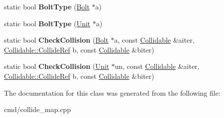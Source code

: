 \begin{DoxyCompactItemize}
\item 
static bool {\bfseries Bolt\+Type} (\hyperlink{classBolt}{Bolt} $\ast$a)\hypertarget{classCollideChecker_abb4927547fd6360d1b061da7c97ecf65}{}\label{classCollideChecker_abb4927547fd6360d1b061da7c97ecf65}

\item 
static bool {\bfseries Bolt\+Type} (\hyperlink{classUnit}{Unit} $\ast$a)\hypertarget{classCollideChecker_a4fdfa579263eadf220f349976d4d469d}{}\label{classCollideChecker_a4fdfa579263eadf220f349976d4d469d}

\item 
static bool {\bfseries Check\+Collision} (\hyperlink{classBolt}{Bolt} $\ast$a, const \hyperlink{classCollidable}{Collidable} \&aiter, \hyperlink{unionCollidable_1_1CollideRef}{Collidable\+::\+Collide\+Ref} b, const \hyperlink{classCollidable}{Collidable} \&biter)\hypertarget{classCollideChecker_ad64daba724830ff498f011fd96b95b86}{}\label{classCollideChecker_ad64daba724830ff498f011fd96b95b86}

\item 
static bool {\bfseries Check\+Collision} (\hyperlink{classUnit}{Unit} $\ast$un, const \hyperlink{classCollidable}{Collidable} \&aiter, \hyperlink{unionCollidable_1_1CollideRef}{Collidable\+::\+Collide\+Ref} b, const \hyperlink{classCollidable}{Collidable} \&biter)\hypertarget{classCollideChecker_a3a4d0ae54ecb1d417f827b8e69de9bc2}{}\label{classCollideChecker_a3a4d0ae54ecb1d417f827b8e69de9bc2}

\end{DoxyCompactItemize}


The documentation for this class was generated from the following file\+:\begin{DoxyCompactItemize}
\item 
cmd/collide\+\_\+map.\+cpp\end{DoxyCompactItemize}
